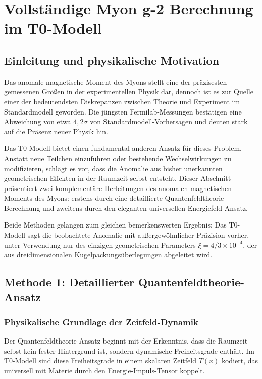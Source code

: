 \documentclass[12pt,a4paper]{article}
\newcommand{\Tfield}{T(x)}
\newcommand{\xipar}{\xi}
\begin{document}
	\section{Vollständige Myon g-2 Berechnung im T0-Modell}
	
	\subsection{Einleitung und physikalische Motivation}
	
	Das anomale magnetische Moment des Myons stellt eine der präzisesten gemessenen Größen in der experimentellen Physik dar, dennoch ist es zur Quelle einer der bedeutendsten Diskrepanzen zwischen Theorie und Experiment im Standardmodell geworden. Die jüngsten Fermilab-Messungen bestätigen eine Abweichung von etwa $4{,}2\sigma$ von Standardmodell-Vorhersagen und deuten stark auf die Präsenz neuer Physik hin.
	
	Das T0-Modell bietet einen fundamental anderen Ansatz für dieses Problem. Anstatt neue Teilchen einzuführen oder bestehende Wechselwirkungen zu modifizieren, schlägt es vor, dass die Anomalie aus bisher unerkannten geometrischen Effekten in der Raumzeit selbst entsteht. Dieser Abschnitt präsentiert zwei komplementäre Herleitungen des anomalen magnetischen Moments des Myons: erstens durch eine detaillierte Quantenfeldtheorie-Berechnung und zweitens durch den eleganten universellen Energiefeld-Ansatz.
	
	Beide Methoden gelangen zum gleichen bemerkenswerten Ergebnis: Das T0-Modell sagt die beobachtete Anomalie mit außergewöhnlicher Präzision vorher, unter Verwendung nur des einzigen geometrischen Parameters $\xipar = 4/3 \times 10^{-4}$, der aus dreidimensionalen Kugelpackungsüberlegungen abgeleitet wird.
	
	\subsection{Methode 1: Detaillierter Quantenfeldtheorie-Ansatz}
	
	\subsubsection{Physikalische Grundlage der Zeitfeld-Dynamik}
	
	Der Quantenfeldtheorie-Ansatz beginnt mit der Erkenntnis, dass die Raumzeit selbst kein fester Hintergrund ist, sondern dynamische Freiheitsgrade enthält. Im T0-Modell sind diese Freiheitsgrade in einem skalaren Zeitfeld $\Tfield$ kodiert, das universell mit Materie durch den Energie-Impuls-Tensor koppelt.
	
\end{document}
